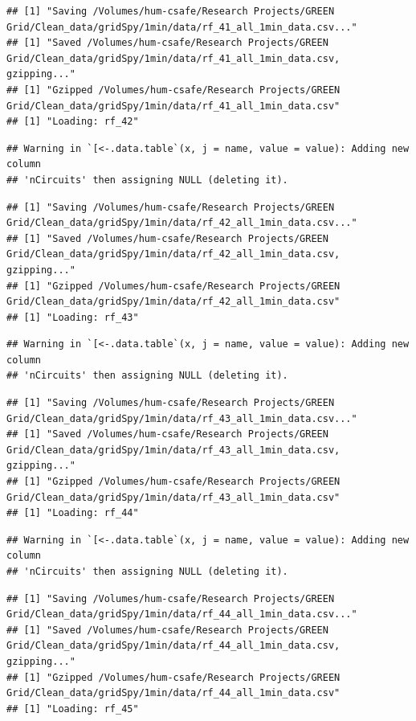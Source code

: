 \documentclass[]{article}
\begin{document}
\begin{verbatim}
## [1] "Saving /Volumes/hum-csafe/Research Projects/GREEN Grid/Clean_data/gridSpy/1min/data/rf_41_all_1min_data.csv..."
## [1] "Saved /Volumes/hum-csafe/Research Projects/GREEN Grid/Clean_data/gridSpy/1min/data/rf_41_all_1min_data.csv, gzipping..."
## [1] "Gzipped /Volumes/hum-csafe/Research Projects/GREEN Grid/Clean_data/gridSpy/1min/data/rf_41_all_1min_data.csv"
## [1] "Loading: rf_42"
\end{verbatim}

\begin{verbatim}
## Warning in `[<-.data.table`(x, j = name, value = value): Adding new column
## 'nCircuits' then assigning NULL (deleting it).
\end{verbatim}

\begin{verbatim}
## [1] "Saving /Volumes/hum-csafe/Research Projects/GREEN Grid/Clean_data/gridSpy/1min/data/rf_42_all_1min_data.csv..."
## [1] "Saved /Volumes/hum-csafe/Research Projects/GREEN Grid/Clean_data/gridSpy/1min/data/rf_42_all_1min_data.csv, gzipping..."
## [1] "Gzipped /Volumes/hum-csafe/Research Projects/GREEN Grid/Clean_data/gridSpy/1min/data/rf_42_all_1min_data.csv"
## [1] "Loading: rf_43"
\end{verbatim}

\begin{verbatim}
## Warning in `[<-.data.table`(x, j = name, value = value): Adding new column
## 'nCircuits' then assigning NULL (deleting it).
\end{verbatim}

\begin{verbatim}
## [1] "Saving /Volumes/hum-csafe/Research Projects/GREEN Grid/Clean_data/gridSpy/1min/data/rf_43_all_1min_data.csv..."
## [1] "Saved /Volumes/hum-csafe/Research Projects/GREEN Grid/Clean_data/gridSpy/1min/data/rf_43_all_1min_data.csv, gzipping..."
## [1] "Gzipped /Volumes/hum-csafe/Research Projects/GREEN Grid/Clean_data/gridSpy/1min/data/rf_43_all_1min_data.csv"
## [1] "Loading: rf_44"
\end{verbatim}

\begin{verbatim}
## Warning in `[<-.data.table`(x, j = name, value = value): Adding new column
## 'nCircuits' then assigning NULL (deleting it).
\end{verbatim}

\begin{verbatim}
## [1] "Saving /Volumes/hum-csafe/Research Projects/GREEN Grid/Clean_data/gridSpy/1min/data/rf_44_all_1min_data.csv..."
## [1] "Saved /Volumes/hum-csafe/Research Projects/GREEN Grid/Clean_data/gridSpy/1min/data/rf_44_all_1min_data.csv, gzipping..."
## [1] "Gzipped /Volumes/hum-csafe/Research Projects/GREEN Grid/Clean_data/gridSpy/1min/data/rf_44_all_1min_data.csv"
## [1] "Loading: rf_45"
\end{verbatim}
\end{document}
